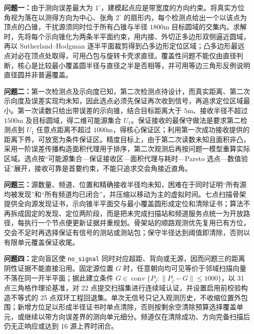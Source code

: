 \textbf{问题一：}由于测向误差最大为 \(1^\circ\)，建模起点应是带宽度的方向约束。将真实方位角视为落在以测得方向为中心、张角 \(2^\circ\) 的扇形内，每个检测点给出一个以该点为顶点的凸锥，干扰源须同时位于所有凸锥与半径 \(1800\mathrm{m}\) 目标圆域的交集内。求解时，先将每个示向锥化为两条半平面约束，用内接、外切正多边形双侧逼近圆域，再以 Sutherland--Hodgman 逐半平面裁剪得到凸多边形定位区域；凸多边形最远点对必在顶点处取得，可用凸包与旋转卡壳求直径。覆盖性问题不能仅由直径判断，核心是比较最小覆盖圆半径与直径之半是否相等，并可用等边三角形反例说明直径圆并非普遍覆盖。

\textbf{问题二：}第一次检测点及示向度已知，第二次检测点待设计，而真实距离、第二次示向度及误差实现均未知，因此选点必须先保证再次收到信号，再追求定位区域最小。第一次读数只给出带误差的示向锥，结合目标距离大于 \(5\mathrm{m}\)、接收半径不超过 \(1500\mathrm{m}\) 及目标圆域，得二维可能源集合 \(U_1\)。保证接收的最保守做法是要求第二检测点到 \(U_1\) 任意点距离不超过 \(1000\mathrm{m}\)，得核心保证区；利用第一次成功接收提供的距离下界，可放宽为条件保证区。精度目标上，由于第二次读数未知且面积非凸，采用一阶误差传播构造面积代理用于排序，第二次观测后再按问题一模型重算实际区域。选点按“可能源集合—保证接收区—面积代理与耗时—Pareto 选点—数值验证”展开，接收可靠是首要约束，不能只追求交会角接近直角。

\textbf{问题三：}源数量、频道、位置和精确接收半径均未知，困难在于同时证明“所有源均被发现”和“所有频道均已闭合”，并压缩以移动为主的虚拟时间。七点扫描骨架提供全向源发现证书，示向锥半平面交与最小覆盖圆形成定位和清除证书；算法不再拆成固定的发现、定位两阶段，而是把未完成扫描站和频道服务点统一为开放路径，每执行一个节点便更新证据并重规划。骨架站的顺路观测优先复用已有方位，交会不足时再选择保证有信号的测站或测站包；保守半径达到阈值即清除，否则以有限单元覆盖保证收尾。

\textbf{问题四：}定向盲区使 \texttt{no\_signal} 同时对应超距、背向或无源，因而问题三的距离阴性证据不能直接沿用。固定源位置 \(G\) 时，任意朝向均可见等价于邻域扫描向量不落在同一开半平面；据此建立条件 \(G\in\operatorname{conv}\{P_j:\|P_j-G\|\le1000\}\)，以 31 点三角格作理论基准，对 22 点提交扫描集进行连续域认证，并设置启用前校验构造不等式的 25 点双环工程回退集。单次无信号只记入观测历史，不收缩位置外包围；新增方位足以形成半径证书时单点清除，否则按剩余空清除预算选择覆盖单元，或继续以带方向误差界的测向单元细分。频道仅在清除成功、方向完备扫描后仍无正响应或达到 16 源上界时闭合。
